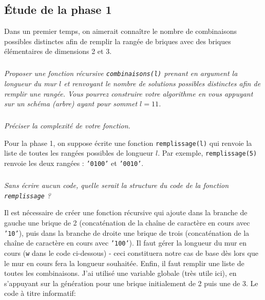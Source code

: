 

\subsection*{\'Etude de la phase 1}
\label{ssec:phase1}

Dans un premier temps, on aimerait connaître le nombre de combinaisons possibles distinctes afin de remplir la rangée de briques avec des briques élémentaires de dimensions 2 et 3.

\subparagraph{}\textit{Proposer une fonction récursive \texttt{combinaisons(l)} prenant en argument la longueur du mur $l$ et renvoyant le nombre de solutions possibles distinctes afin de remplir une rangée. Vous pourrez construire votre algorithme en vous appuyant sur un schéma (arbre) ayant pour sommet $l=11$.}


\subparagraph{}\textit{Préciser la complexité de votre fonction.}

Pour la phase 1, on suppose écrite une fonction \texttt{remplissage(l)} qui renvoie la liste de toutes les rangées possibles de longueur $l$. Par exemple, \texttt{remplissage(5)} renvoie les deux rangées : \texttt{'0100'} et \texttt{'0010'}.









\subparagraph{}\textit{Sans écrire aucun code, quelle serait la structure du code de la fonction \texttt{remplissage} ?}


\ifprof
\else
Il est nécessaire de créer une fonction récursive qui ajoute dans la branche de gauche une brique de 2 (concaténation de la chaîne de caractère en cours avec \texttt{'10'}), puis dans la branche de droite une brique de trois (concaténation de la chaîne de caractère en cours avec \texttt{'100'}). Il faut gérer la longueur du mur en cours (\texttt{w} dans le code ci-dessous) - ceci constituera notre cas de base dès lors que le mur en cours fera la longueur souhaitée. Enfin, il faut remplir une liste de toutes les combinaisons. J'ai utilisé une variable globale (très utile ici), en s'appuyant sur la génération pour une brique initialement de 2 puis une de 3. Le code à titre informatif:
\fi

